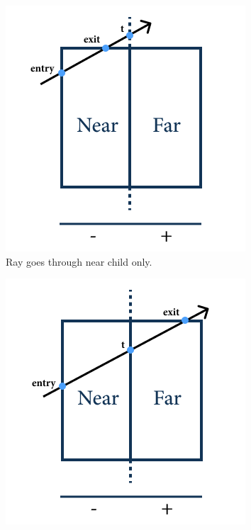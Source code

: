 \documentclass[a4paper,11pt,oneside]{article}
\begin{document}
\begin{figure}[ht]
	\centering
	\begin{subfigure}[b]{0.3\textwidth}
		\centering
		\includegraphics[width=\textwidth]{section4/4.3/near-intersection.png}
		\caption{Ray goes through near child only.}
		\label{sec4.3:near-child}
	\end{subfigure}
	\hfill
	\begin{subfigure}[b]{0.3\textwidth}
		\centering
		\includegraphics[width=\textwidth]{section4/4.3/middle-intersection.png}

\end{subfigure}
\end{figure}
\end{document}
